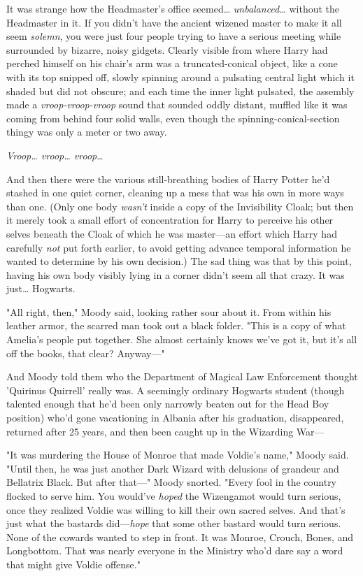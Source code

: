It was strange how the Headmaster's office seemed{\ldots} 
\emph{unbalanced{\ldots}} without the Headmaster in it. If you didn't have the 
ancient wizened master to make it all seem \emph{solemn}, you were just four 
people trying to have a serious meeting while surrounded by bizarre, noisy 
gidgets. Clearly visible from where Harry had perched himself on his chair's 
arm was a truncated-conical object, like a cone with its top snipped off, 
slowly spinning around a pulsating central light which it shaded but did not 
obscure; and each time the inner light pulsated, the assembly made a 
\emph{vroop-vroop-vroop} sound that sounded oddly distant, muffled like it was 
coming from behind four solid walls, even though the spinning-conical-section 
thingy was only a meter or two away.

\emph{Vroop{\ldots} vroop{\ldots} vroop}{\ldots}

And then there were the various still-breathing bodies of Harry Potter he'd 
stashed in one quiet corner, cleaning up a mess that was his own in more ways 
than one. (Only one body \emph{wasn't} inside a copy of the Invisibility Cloak; 
but then it merely took a small effort of concentration for Harry to perceive 
his other selves beneath the Cloak of which he was master---an effort which 
Harry had carefully \emph{not} put forth earlier, to avoid getting advance 
temporal information he wanted to determine by his own decision.) The sad thing 
was that by this point, having his own body visibly lying in a corner didn't 
seem all that crazy. It was just{\ldots} Hogwarts.

"All right, then," Moody said, looking rather sour about it. From within his 
leather armor, the scarred man took out a black folder. "This is a copy of what 
Amelia's people put together. She almost certainly knows we've got it, but it's 
all off the books, that clear? Anyway---"

And Moody told them who the Department of Magical Law Enforcement thought 
'Quirinus Quirrell' really was. A seemingly ordinary Hogwarts student (though 
talented enough that he'd been only narrowly beaten out for the Head Boy 
position) who'd gone vacationing in Albania after his graduation, disappeared, 
returned after 25 years, and then been caught up in the Wizarding War---

"It was murdering the House of Monroe that made Voldie's name," Moody said. 
"Until then, he was just another Dark Wizard with delusions of grandeur and 
Bellatrix Black. But after that---" Moody snorted. "Every fool in the country 
flocked to serve him. You would've \emph{hoped} the Wizengamot would turn 
serious, once they realized Voldie was willing to kill their own sacred selves. 
And that's just what the bastards did---\emph{hope} that some other bastard 
would turn serious. None of the cowards wanted to step in front. It was Monroe, 
Crouch, Bones, and Longbottom. That was nearly everyone in the Ministry who'd 
dare say a word that might give Voldie offense."

